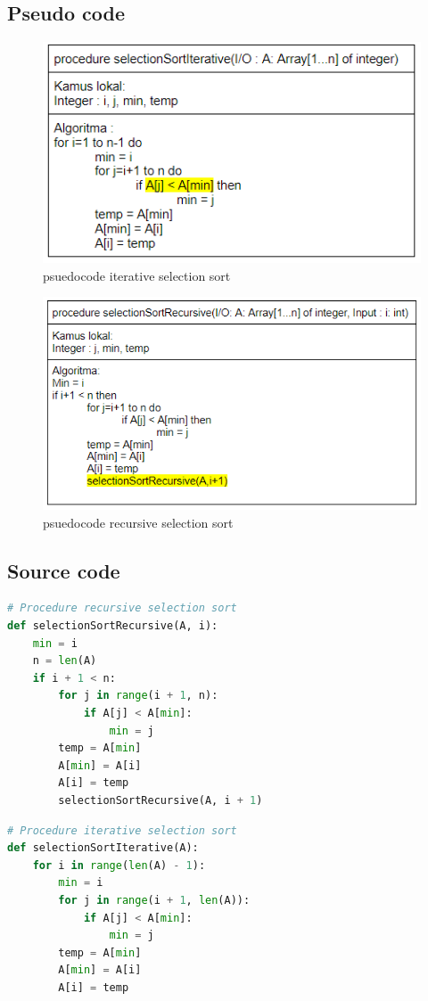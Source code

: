 \documentclass[12pt]{article}
\begin{document}
\subsection{Pseudo code}
\begin{figure}[h!]
    \centering
    \includegraphics[width=1\textwidth]{images/pseudocodeIterative.PNG}
    \caption{psuedocode iterative selection sort}
\end{figure}
\newpage
\begin{figure}[h!]
    \centering
    \includegraphics[width=1\textwidth]{images/pseudocodeRecursive.PNG}
    \caption{psuedocode recursive selection sort}
\end{figure}
\newpage
\subsection{Source code}
\begin{lstlisting}[language=Python]
# Procedure recursive selection sort
def selectionSortRecursive(A, i):
    min = i
    n = len(A)
    if i + 1 < n:
        for j in range(i + 1, n):
            if A[j] < A[min]:
                min = j
        temp = A[min]
        A[min] = A[i]
        A[i] = temp    
        selectionSortRecursive(A, i + 1)
\end{lstlisting}
\begin{lstlisting}[language=Python]
# Procedure iterative selection sort
def selectionSortIterative(A):
    for i in range(len(A) - 1):
        min = i
        for j in range(i + 1, len(A)):
            if A[j] < A[min]:
                min = j
        temp = A[min]
        A[min] = A[i]
        A[i] = temp
\end{lstlisting}
\newpage
\end{document}
